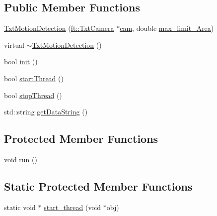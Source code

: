 \subsection*{Public Member Functions}
\begin{DoxyCompactItemize}
\item 
\hyperlink{classft_1_1_txt_motion_detection_a25f406788eeb041eeec88a058185062d}{Txt\+Motion\+Detection} (\hyperlink{classft_1_1_txt_camera}{ft\+::\+Txt\+Camera} $\ast$\hyperlink{classft_1_1_txt_motion_detection_a0fcc4c62dbeb1839d705045e1a8473ad}{cam}, double \hyperlink{classft_1_1_txt_motion_detection_a6f681c16ea2ae02579eddaa0046662c6}{max\+\_\+limit\+\_\+\+Area})
\item 
virtual \hyperlink{classft_1_1_txt_motion_detection_a78177169e6e08606337ee5714ab73daa}{$\sim$\+Txt\+Motion\+Detection} ()
\item 
bool \hyperlink{classft_1_1_txt_motion_detection_ac1fa56ffd0e8ff3d6b55c128b4c2f7a7}{init} ()
\item 
bool \hyperlink{classft_1_1_txt_motion_detection_aff17b71df6cb5d0f7b213100bb4f4ac3}{start\+Thread} ()
\item 
bool \hyperlink{classft_1_1_txt_motion_detection_a1fbb361b7a5872ab28a96c7eaf4d7d13}{stop\+Thread} ()
\item 
std\+::string \hyperlink{classft_1_1_txt_motion_detection_a36924977e1c1f056508659b9f276cea1}{get\+Data\+String} ()
\end{DoxyCompactItemize}
\subsection*{Protected Member Functions}
\begin{DoxyCompactItemize}
\item 
void \hyperlink{classft_1_1_txt_motion_detection_a5cde1079735e8da9986f50bb6a32fec9}{run} ()
\end{DoxyCompactItemize}
\subsection*{Static Protected Member Functions}
\begin{DoxyCompactItemize}
\item 
static void $\ast$ \hyperlink{classft_1_1_txt_motion_detection_a032ad6f0adedc9921843585dc211b52e}{start\+\_\+thread} (void $\ast$obj)
\end{DoxyCompactItemize}
